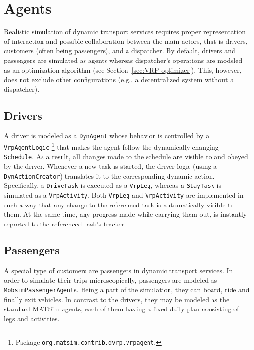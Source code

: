 
\section{Agents}

Realistic simulation of dynamic transport services requires proper representation of interaction and possible collaboration between the main actors, that is drivers, customers (often being passengers), and a dispatcher. By default, drivers and passengers are simulated as agents whereas dispatcher's operations are modeled as an optimization algorithm (see Section~\ref{sec:VRP-optimizer}). This, however, does not exclude other configurations (e.g., a decentralized system without a dispatcher).

\subsection{Drivers}
\label{sec:VRP-agent}

A driver is modeled as a \lstinline$DynAgent$ whose behavior is controlled by a \lstinline$VrpAgentLogic$%
\footnote{
Package \lstinline$org.matsim.contrib.dvrp.vrpagent$.
}
that makes the agent follow the dynamically changing \lstinline$Schedule$. As a result, all changes made to the schedule are visible to and obeyed by the driver. Whenever a new task is started, the driver logic (using a \lstinline$DynActionCreator$) translates it to the corresponding dynamic action. Specifically, a \lstinline$DriveTask$ is executed as a \lstinline$VrpLeg$, whereas a \lstinline$StayTask$ is simulated as a \lstinline$VrpActivity$. Both \lstinline$VrpLeg$ and \lstinline$VrpActivity$ are implemented in such a way that any change to the referenced task is automatically visible to them. At the same time, any progress made while carrying them out, is instantly reported to the referenced task's tracker.

\subsection{Passengers}
\label{sec:VRP-passengers}

A special type of customers are passengers in dynamic transport services. In order to simulate their trips microscopically, passengers are modeled as \lstinline$MobsimPassengerAgent$s. Being a part of the simulation, they can board, ride and finally exit vehicles. In contrast to the drivers, they may be modeled as the standard MATSim agents, each of them having a fixed daily plan consisting of legs and activities.


